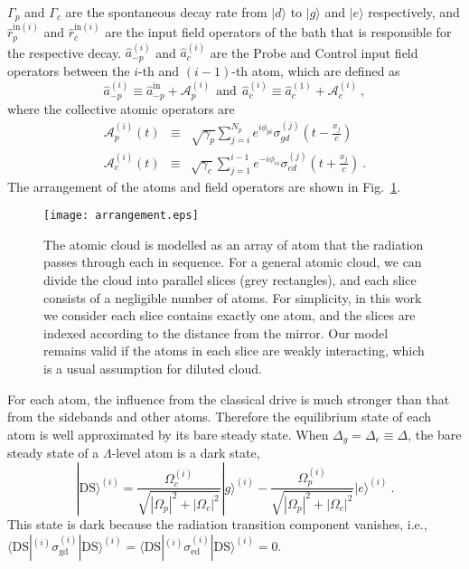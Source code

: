 \documentclass[aps, pra, reprint, amsmath, amssymb, groupedaddress, acknowledgments]{revtex4-1}
\begin{document}
$\Gamma_p$ and $\Gamma_c$ are the spontaneous decay rate from $|d\rangle$ to $|g\rangle$ and $|e\rangle$ respectively, and $\hat{r}_p^{\textrm{in}(i)}$ and $\hat{r}_c^{\textrm{in}(i)}$ are the input field operators of the bath that is responsible for the respective decay.  
$\hat{a}_{-p}^{(i)}$ and $\hat{a}_{c}^{(i)}$ are the Probe and Control input field operators between the $i$-th and $(i-1)$-th atom, which are defined as
\begin{equation}\label{eq:a_i}
\hat{a}_{-p}^{(i)} \equiv \hat{a}_{-p}^\textrm{in} + \mathcal{A}_p^{(i)}~~\textrm{and}~~\hat{a}_c^{(i)} \equiv \hat{a}_c^{(1)}+\mathcal{A}_c^{(i)}~,
\end{equation}
where the collective atomic operators are
\begin{eqnarray}\label{eq:def_Ap}
\mathcal{A}_p^{(i)}(t) &\equiv& \sqrt{\gamma_p} \sum_{j= i}^{N_p} e^{i \phi_{pi}}\sigma^{(j)}_{gd} (t-\frac{x_j}{c}) \\
\mathcal{A}_c^{(i)}(t) &\equiv& \sqrt{\gamma_c} \sum_{j=1}^{i-1} e^{-i \phi_{ci}} \sigma^{(j)}_{ed}(t+\frac{x_j}{c})~.\label{eq:def_Ac}
\end{eqnarray} 
The arrangement of the atoms and field operators are shown in Fig.~\ref{fig:arrange}.

\begin{figure}
\begin{center}
\texttt{[image: arrangement.eps]}
\caption{ \label{fig:arrange}  The atomic cloud is modelled as an array of atom that the radiation passes through each in sequence.  For a general atomic cloud, we can divide the cloud into parallel slices (grey rectangles), and each slice consists of a negligible number of atoms. For simplicity, in this work we consider each slice contains exactly one atom, and the slices are indexed according to the distance from the mirror.   Our model remains valid if the atoms in each slice are weakly interacting, which is a usual assumption for diluted cloud.
}
\end{center}
\end{figure}

For each atom, the influence from the classical drive is much stronger than that from the sidebands and other atoms.  Therefore the equilibrium state of each atom is well approximated by its bare steady state.
When $\Delta_g=\Delta_e\equiv \Delta$, the bare steady state of a $\Lambda$-level atom is a dark state, 
\begin{equation}
|\textrm{DS}\rangle^{(i)} = \frac{\Omega_c^{(i)}}{\sqrt{|\Omega_p|^2 + |\Omega_c|^2}} |g\rangle^{(i)} - \frac{\Omega_p^{(i)}}{\sqrt{|\Omega_p|^2 + |\Omega_c|^2}} |e\rangle^{(i)}~.
\end{equation}
This state is dark because the radiation transition component vanishes, i.e., $\langle \textrm{DS}|^{(i)}\sigma_\textrm{gd}^{(i)}|\textrm{DS}\rangle^{(i)}=\langle \textrm{DS}|^{(i)} \sigma_\textrm{ed}^{(i)}|\textrm{DS}\rangle^{(i)} = 0$.
\end{document}
